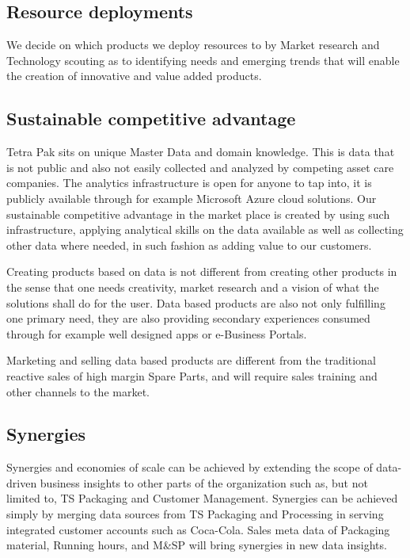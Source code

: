 \documentclass[10pt]{article} %
\begin{document}
\subsection{Resource deployments}

We decide on which products we deploy resources to by Market research and Technology scouting as to identifying needs and emerging trends that will enable the creation of innovative and value added products.

\subsection{Sustainable competitive advantage}

Tetra Pak sits on unique Master Data and domain knowledge. This is data that is not public and also not easily collected and analyzed by competing asset care companies. The analytics infrastructure is open for anyone to tap into, it is publicly available through for example Microsoft Azure cloud solutions. Our sustainable competitive advantage in the market place is created by using such infrastructure, applying analytical skills on the data available as well as collecting other data where needed, in such fashion as adding value to our customers. 

Creating products based on data is not different from creating other products in the sense that one needs creativity, market research and a vision of what the solutions shall do for the user. Data based products are also not only fulfilling one primary need, they are also providing secondary experiences consumed through for example well designed apps or e-Business Portals.

Marketing and selling data based products are different from the traditional reactive sales of high margin Spare Parts, and will require sales training and other channels to the market.

\subsection{Synergies}

Synergies and economies of scale can be achieved by extending the scope of data-driven business insights to other parts of the organization such as, but not limited to, TS Packaging and Customer Management. Synergies can be achieved simply by merging data sources from TS Packaging and Processing in serving integrated customer accounts such as Coca-Cola. Sales meta data of Packaging material, Running hours, and M\&SP will bring synergies in new data insights.
\end{document}
